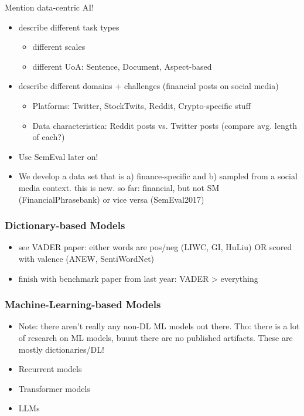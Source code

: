 Mention data-centric AI!
\begin{itemize}[noitemsep]
	\item describe different task types
	\begin{itemize}
		\item different scales
		\item different UoA: Sentence, Document, Aspect-based
	\end{itemize}
	\item describe different domains + challenges (financial posts on social media)
	\begin{itemize}[noitemsep]
		\item Platforms: Twitter, StockTwits, Reddit, Crypto-specific stuff
		\item Data characteristica: Reddit posts vs. Twitter posts (compare avg. length of each?)
\end{itemize}
	\item Use SemEval later on!
	\item We develop a data set that is a) finance-specific and b) sampled from a social media context. this is new. so far: financial, but not SM (FinancialPhrasebank) or vice versa (SemEval2017)
\end{itemize}

\subsubsection{Dictionary-based Models}
\begin{itemize}
	\item see VADER paper: either words are pos/neg (LIWC, GI, HuLiu) OR scored with valence (ANEW, SentiWordNet)
	\item finish with benchmark paper from last year: VADER > everything
\end{itemize}

\subsubsection{Machine-Learning-based Models}
\begin{itemize}[noitemsep]
	\item Note: there aren't really any non-DL ML models out there. Tho: there is a lot of research on ML models, buuut there are no published artifacts. These are mostly dictionaries/DL!
	\item Recurrent models
	\item Transformer models
	\item LLMs
\end{itemize}


